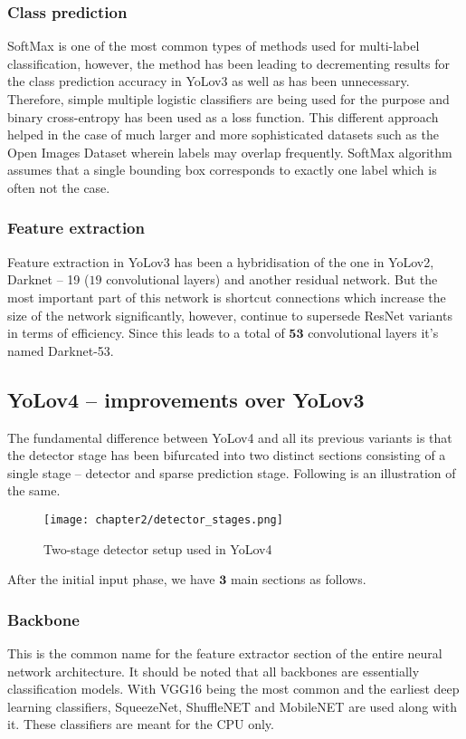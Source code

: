 \subsubsection{Class prediction}
SoftMax is one of the most common types of methods used for multi-label classification, however, the method has been leading to decrementing results for the class prediction accuracy in YoLov3 as well as has been unnecessary. Therefore, simple multiple logistic classifiers are being used for the purpose and binary cross-entropy has been used as a loss function. This different approach helped in the case of much larger and more sophisticated datasets such as the Open Images Dataset wherein labels may overlap frequently. SoftMax algorithm assumes that a single bounding box corresponds to exactly one label which is often not the case.

\subsubsection{Feature extraction}
Feature extraction in YoLov3 has been a hybridisation of the one in YoLov2, Darknet – 19 ($19$ convolutional layers) and another residual network. But the most important part of this network is shortcut connections which increase the size of the network significantly, however, continue to supersede ResNet variants in terms of efficiency. Since this leads to a total of $\boldsymbol{53}$ convolutional layers it's named Darknet-53.


\subsection{YoLov4 – improvements over YoLov3}

The fundamental difference between YoLov4 and all its previous variants is that the detector stage has been bifurcated into two distinct sections consisting of a single stage – detector and sparse prediction stage. Following is an illustration of the same.

\begin{figure}[h]
  \centering
  \texttt{[image: chapter2/detector\_stages.png]}
  \caption{Two-stage detector setup used in YoLov4}
  \label{fig:detector}
\end{figure}

After the initial input phase, we have $\boldsymbol{3}$ main sections as follows.

\subsubsection{Backbone}
This is the common name for the feature extractor section of the entire neural network architecture. It should be noted that all backbones are essentially classification models. With VGG16 being the most common and the earliest deep learning classifiers, SqueezeNet, ShuffleNET and MobileNET are used along with it. These classifiers are meant for the CPU only.

